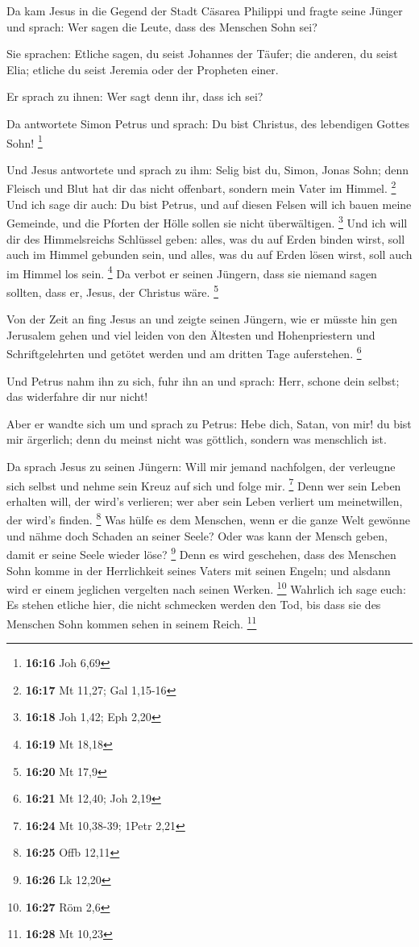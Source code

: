  Da kam Jesus in die Gegend der Stadt Cäsarea Philippi
und fragte seine Jünger und sprach: Wer sagen die Leute, dass des
Menschen Sohn sei?

 Sie sprachen: Etliche sagen, du seist Johannes der
Täufer; die anderen, du seist Elia; etliche du seist Jeremia oder der
Propheten einer.

 Er sprach zu ihnen: Wer sagt denn ihr, dass ich sei?

 Da antwortete Simon Petrus und sprach: Du bist Christus,
des lebendigen Gottes Sohn! \footnote{\textbf{16:16} Joh 6,69}

 Und Jesus antwortete und sprach zu ihm: Selig bist du,
Simon, Jonas Sohn; denn Fleisch und Blut hat dir das nicht offenbart,
sondern mein Vater im Himmel. \footnote{\textbf{16:17} Mt 11,27; Gal
  1,15-16}  Und ich sage dir auch: Du bist Petrus, und
auf diesen Felsen will ich bauen meine Gemeinde, und die Pforten der
Hölle sollen sie nicht überwältigen. \footnote{\textbf{16:18} Joh 1,42;
  Eph 2,20}  Und ich will dir des Himmelsreichs Schlüssel
geben: alles, was du auf Erden binden wirst, soll auch im Himmel
gebunden sein, und alles, was du auf Erden lösen wirst, soll auch im
Himmel los sein. \footnote{\textbf{16:19} Mt 18,18}  Da
verbot er seinen Jüngern, dass sie niemand sagen sollten, dass er,
Jesus, der Christus wäre. \footnote{\textbf{16:20} Mt 17,9}

 Von der Zeit an fing Jesus an und zeigte seinen Jüngern,
wie er müsste hin gen Jerusalem gehen und viel leiden von den Ältesten
und Hohenpriestern und Schriftgelehrten und getötet werden und am
dritten Tage auferstehen. \footnote{\textbf{16:21} Mt 12,40; Joh 2,19}

 Und Petrus nahm ihn zu sich, fuhr ihn an und sprach:
Herr, schone dein selbst; das widerfahre dir nur nicht!

 Aber er wandte sich um und sprach zu Petrus: Hebe dich,
Satan, von mir! du bist mir ärgerlich; denn du meinst nicht was
göttlich, sondern was menschlich ist.

 Da sprach Jesus zu seinen Jüngern: Will mir jemand
nachfolgen, der verleugne sich selbst und nehme sein Kreuz auf sich und
folge mir. \footnote{\textbf{16:24} Mt 10,38-39; 1Petr 2,21}
 Denn wer sein Leben erhalten will, der wird's verlieren;
wer aber sein Leben verliert um meinetwillen, der wird's finden.
\footnote{\textbf{16:25} Offb 12,11}  Was hülfe es dem
Menschen, wenn er die ganze Welt gewönne und nähme doch Schaden an
seiner Seele? Oder was kann der Mensch geben, damit er seine Seele
wieder löse? \footnote{\textbf{16:26} Lk 12,20}  Denn es
wird geschehen, dass des Menschen Sohn komme in der Herrlichkeit seines
Vaters mit seinen Engeln; und alsdann wird er einem jeglichen vergelten
nach seinen Werken. \footnote{\textbf{16:27} Röm 2,6} 
Wahrlich ich sage euch: Es stehen etliche hier, die nicht schmecken
werden den Tod, bis dass sie des Menschen Sohn kommen sehen in seinem
Reich. \footnote{\textbf{16:28} Mt 10,23}

